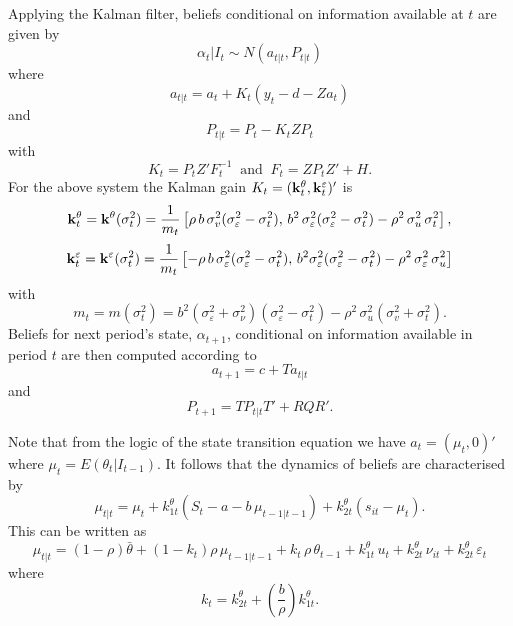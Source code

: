 \documentclass[a4,12pt]{article}
\begin{document}
Applying the Kalman filter, beliefs conditional on information available at $t$ are given by
\[ \alpha_t | I_t \sim N(a_{t|t}, P_{t|t}) \]
where
\begin{equation*}
a_{t|t} = a_t + K_t (y_t - d - Z a_t)
\end{equation*}
and
\begin{equation*}
P_{t|t} = P_t - K_t Z P_t
\end{equation*}
with
\begin{equation*}
K_t = P_t Z' F_t^{-1} \; \; \mbox{and} \; \; F_t = Z P_t Z' + H.
\end{equation*}
For the above system the Kalman gain $K_t = (\bold{k}_t^{\theta}, \bold{k}_t^{\varepsilon})'$ is
\begin{equation}\label{kalman_theta}
\bold{k}_t^{\theta} = \bold{k}^\theta(\sigma_{t}^2) = \frac{1}{m_t} \left[ \rho \, b \, \sigma_v^2 (\sigma_\varepsilon^2 - \sigma_t^2), \, b^2 \, \sigma_\varepsilon^2 (\sigma_\varepsilon^2 - \sigma_t^2) - \rho^2 \, \sigma_u^2 \, \sigma_t^2 \right],
\end{equation}
\begin{equation}
\bold{k}_t^{\varepsilon} = \bold{k}^\varepsilon(\sigma_{t}^2) = \frac{1}{m_t} \left[ - \rho \, b \, \sigma_\varepsilon^2 (\sigma_\varepsilon^2 - \sigma_t^2), \,  b^2 \sigma_\varepsilon^2 (\sigma_\varepsilon^2 - \sigma_t^2) -  \rho^2 \, \sigma_\varepsilon^2 \, \sigma_u^2 \right]
\end{equation}
with
\begin{equation}
m_t = m(\sigma_t^2) = b^2 (\sigma_\varepsilon^2 + \sigma_\nu^2)(\sigma_\varepsilon^2 - \sigma_t^2) - \rho^2 \, \sigma_u^2 (\sigma_v^2 + \sigma_t^2).
\end{equation}
Beliefs for next period's state, $\alpha_{t+1}$, conditional on information available in period $t$ are then computed according to
\begin{equation}
a_{t+1} = c + T a_{t|t}
\end{equation}
and
\begin{equation}
P_{t+1} = T P_{t|t} T' + R Q R' .
\end{equation}

Note that from the logic of the state transition equation we have $a_t = (\mu_t, 0)'$ where $\mu_t = E(\theta_t | I_{t-1})$. It follows that the dynamics of beliefs are characterised by
\begin{equation*}
\mu_{t|t} = \mu_t + k_{1t}^{\theta} \left( S_t - a - b \, \mu_{t-1|t-1} \right) + k_{2t}^{\theta} \left( s_{it} - \mu_t \right).
\end{equation*}
This can be written as
\begin{equation}
\mu_{t|t} = (1-\rho) \bar{\theta} + (1-k_t) \rho \, \mu_{t-1|t-1} + k_t \, \rho \, \theta_{t-1} + k_{1t}^\theta \, u_t + k_{2t}^\theta \, \nu_{it} + k_{2t}^\theta \, \varepsilon_t
\end{equation}
where
\begin{equation*}
k_t = k_{2t}^\theta + \left( \frac{b}{\rho} \right) k_{1t}^\theta .
\end{equation*}
\end{document}
